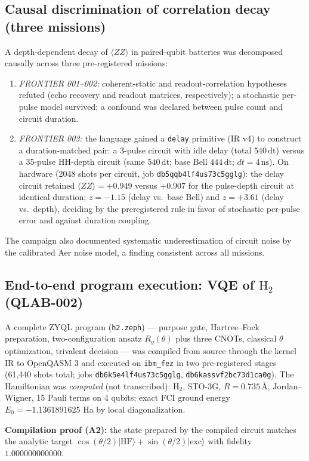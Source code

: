 \documentclass[11pt]{article}
\begin{document}
\subsection{Causal discrimination of correlation decay (three missions)}
A depth-dependent decay of $\langle ZZ\rangle$ in paired-qubit batteries was decomposed causally across three pre-registered missions:
\begin{enumerate}
\item \emph{FRONTIER 001--002:} coherent-static and readout-correlation hypotheses refuted (echo recovery and readout matrices, respectively); a stochastic per-pulse model survived; a confound was declared between pulse count and circuit duration.
\item \emph{FRONTIER 003:} the language gained a \texttt{delay} primitive (IR v4) to construct a duration-matched pair: a 3-pulse circuit with idle delay (total $540\,\mathrm{dt}$) versus a 35-pulse HH-depth circuit (same $540\,\mathrm{dt}$; base Bell $444\,\mathrm{dt}$; $dt = 4\,\mathrm{ns}$). On hardware (2048 shots per circuit, job \texttt{db5qqb4lf4us73c5gglg}): the delay circuit retained $\langle ZZ\rangle = +0.949$ versus $+0.907$ for the pulse-depth circuit at identical duration; $z = -1.15$ (delay vs.\ base Bell) and $z = +3.61$ (delay vs.\ depth), deciding by the preregistered rule in favor of stochastic per-pulse error and against duration coupling.
\end{enumerate}
The campaign also documented systematic underestimation of circuit noise by the calibrated Aer noise model, a finding consistent across all missions.

\subsection{End-to-end program execution: VQE of $\mathrm{H_2}$ (QLAB-002)}
A complete ZYQL program (\texttt{h2.zeph}) --- purpose gate, Hartree--Fock preparation, two-configuration ansatz $R_y(\theta)$ plus three CNOTs, classical $\theta$ optimization, trivalent decision --- was compiled from source through the kernel IR to OpenQASM 3 and executed on \texttt{ibm\_fez} in two pre-registered stages (61{,}440 shots total; jobs \texttt{db6k5e4lf4us73c5gglg}, \texttt{db6kassvf2bc73d1ca0g}). The Hamiltonian was \emph{computed} (not transcribed): $\mathrm{H_2}$, STO-3G, $R = 0.735$\,\AA, Jordan--Wigner, 15 Pauli terms on 4 qubits; exact FCI ground energy $E_0 = -1.1361891625$ Ha by local diagonalization.

\textbf{Compilation proof (A2):} the state prepared by the compiled circuit matches the analytic target $\cos(\theta/2)|\mathrm{HF}\rangle + \sin(\theta/2)|\mathrm{exc}\rangle$ with fidelity $1.000000000000$.
\end{document}
